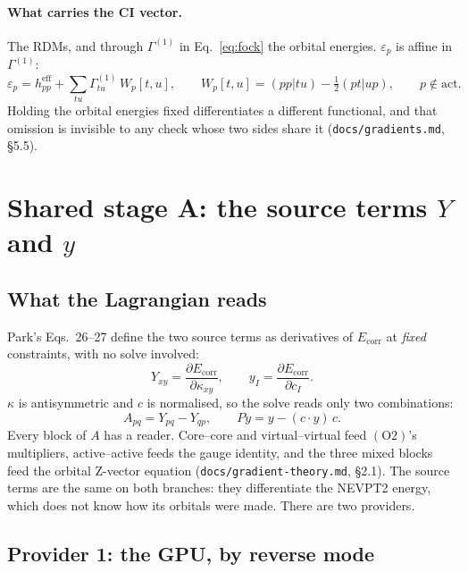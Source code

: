 \documentclass[11pt]{article}
\newcommand{\code}[1]{\texttt{#1}}
\newcommand{\G}[1]{\Gamma^{(#1)}}
\newcommand{\eps}{\varepsilon}
\newcommand{\heff}{h^{\mathrm{eff}}}
\newcommand{\Ecorr}{E_{\mathrm{corr}}}
\newcommand{\cons}[1]{\ensuremath{(\mathrm{#1})}}
\begin{document}
\paragraph{What carries the CI vector.} The RDMs, and through $\G1$ in
Eq.~\eqref{eq:fock} the orbital energies. $\eps_p$ is affine in $\G1$:
\begin{equation}
  \eps_p = \heff_{pp} + \sum_{tu} \G1_{tu}\,W_p[t,u],\qquad
  W_p[t,u] = (pp|tu) - \tfrac12(pt|up),\qquad p\notin\mathrm{act}.
  \label{eq:epsW}
\end{equation}
Holding the orbital energies fixed differentiates a different functional, and
that omission is invisible to any check whose two sides share it
(\code{docs/gradients.md}, \S5.5).

\section{\texorpdfstring{Shared stage A: the source terms $Y$ and $y$}{Shared stage A: the source terms Y and y}}
\label{sec:src}

\subsection{What the Lagrangian reads}
Park's Eqs.~26--27 define the two source terms as derivatives of $\Ecorr$ at
\emph{fixed} constraints, with no solve involved:
\begin{equation}
  Y_{xy} = \frac{\partial \Ecorr}{\partial \kappa_{xy}},\qquad
  y_I = \frac{\partial \Ecorr}{\partial c_I}.
  \label{eq:YY}
\end{equation}
$\kappa$ is antisymmetric and $c$ is normalised, so the solve reads only two
combinations:
\begin{equation}
  A_{pq} = Y_{pq} - Y_{qp},\qquad Py = y - (c\cdot y)\,c.
  \label{eq:Apy}
\end{equation}
Every block of $A$ has a reader. Core--core and virtual--virtual feed
\cons{O2}'s multipliers, active--active feeds the gauge identity, and the
three mixed blocks feed the orbital Z-vector equation
(\code{docs/gradient-theory.md}, \S2.1). The source terms are the same on both
branches: they differentiate the NEVPT2 energy, which does not know how its
orbitals were made. There are two providers.

\subsection{Provider 1: the GPU, by reverse mode}
\label{sec:src-gpu}
\end{document}
